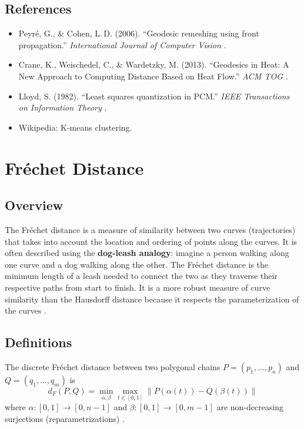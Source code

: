 \subsection{References}
\begin{itemize}
  \item Peyr\'{e}, G., \& Cohen, L.\,D. (2006). ``Geodesic remeshing using front propagation.'' \textit{International Journal of Computer Vision} \cite{peyre2006}.
  \item Crane, K., Weischedel, C., \& Wardetzky, M. (2013). ``Geodesics in Heat: A New Approach to Computing Distance Based on Heat Flow.'' \textit{ACM TOG} \cite{crane2013geodesic}.
  \item Lloyd, S. (1982). ``Least squares quantization in PCM.'' \textit{IEEE Transactions on Information Theory} \cite{lloyd1982}.
  \item Wikipedia: K-means clustering.
\end{itemize}

\section{Fr\'{e}chet Distance}
\label{sec:frechet_distance}

\subsection{Overview}
The Fr\'{e}chet distance is a measure of similarity between two curves (trajectories) that takes into account the location and ordering of points along the curves. It is often described using the \textbf{dog-leash analogy}: imagine a person walking along one curve and a dog walking along the other. The Fr\'{e}chet distance is the minimum length of a leash needed to connect the two as they traverse their respective paths from start to finish. It is a more robust measure of curve similarity than the Hausdorff distance because it respects the parameterization of the curves \cite{frechet1906}.

\subsection{Definitions}
\begin{definition}\label{def:discrete_frechet}
The discrete Fr\'{e}chet distance between two polygonal chains $P = (p_1, \ldots, p_n)$ and $Q = (q_1, \ldots, q_m)$ is
$$d_F(P, Q) = \min_{\alpha, \beta} \max_{t \in [0,1]} \|P(\alpha(t)) - Q(\beta(t))\|$$
where $\alpha: [0,1] \to [0,n-1]$ and $\beta: [0,1] \to [0,m-1]$ are non-decreasing surjections (reparametrizations) \cite{frechet1906,alt1995}.
\end{definition}

